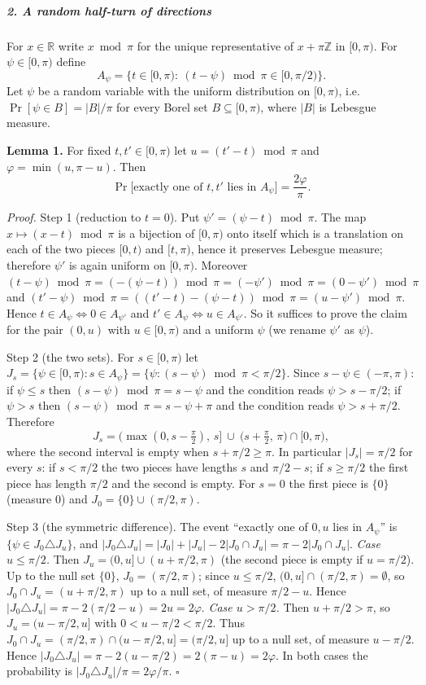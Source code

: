 \documentclass[11pt,a4paper]{article}
\begin{document}
\subparagraph{2. A random half-turn of
directions}\label{a-random-half-turn-of-directions}

For \(x\in\mathbb R\) write \(x\bmod\pi\) for the unique representative
of \(x+\pi\mathbb Z\) in \([0,\pi)\). For \(\psi\in[0,\pi)\) define
\[A_\psi=\{t\in[0,\pi):\ (t-\psi)\bmod\pi\in[0,\pi/2)\}.\] Let \(\psi\)
be a random variable with the uniform distribution on \([0,\pi)\),
i.e.~\(\Pr[\psi\in B]=|B|/\pi\) for every Borel set
\(B\subseteq[0,\pi)\), where \(|B|\) is Lebesgue measure.

\textbf{Lemma 1.} For fixed \(t,t'\in[0,\pi)\) let \(u=(t'-t)\bmod\pi\)
and \(\varphi=\min(u,\pi-u)\). Then
\[\Pr\big[\text{exactly one of } t,t' \text{ lies in } A_\psi\big]=\frac{2\varphi}{\pi}.\]

\emph{Proof.} Step 1 (reduction to \(t=0\)). Put
\(\psi'=(\psi-t)\bmod\pi\). The map \(x\mapsto(x-t)\bmod\pi\) is a
bijection of \([0,\pi)\) onto itself which is a translation on each of
the two pieces \([0,t)\) and \([t,\pi)\), hence it preserves Lebesgue
measure; therefore \(\psi'\) is again uniform on \([0,\pi)\). Moreover
\((t-\psi)\bmod\pi=(-(\psi-t))\bmod\pi=(-\psi')\bmod\pi=(0-\psi')\bmod\pi\)
and \((t'-\psi)\bmod\pi=((t'-t)-(\psi-t))\bmod\pi=(u-\psi')\bmod\pi\).
Hence \(t\in A_\psi\iff 0\in A_{\psi'}\) and
\(t'\in A_\psi\iff u\in A_{\psi'}\). So it suffices to prove the claim
for the pair \((0,u)\) with \(u\in[0,\pi)\) and a uniform \(\psi\) (we
rename \(\psi'\) as \(\psi\)).

Step 2 (the two sets). For \(s\in[0,\pi)\) let
\(J_s=\{\psi\in[0,\pi): s\in A_\psi\}=\{\psi: (s-\psi)\bmod\pi<\pi/2\}\).
Since \(s-\psi\in(-\pi,\pi)\): if \(\psi\le s\) then
\((s-\psi)\bmod\pi=s-\psi\) and the condition reads \(\psi>s-\pi/2\); if
\(\psi>s\) then \((s-\psi)\bmod\pi=s-\psi+\pi\) and the condition reads
\(\psi>s+\pi/2\). Therefore
\[J_s=\big(\max(0,s-\tfrac{\pi}{2}),\,s\big]\ \cup\ \big(s+\tfrac{\pi}{2},\,\pi\big)\cap[0,\pi),\]
where the second interval is empty when \(s+\pi/2\ge\pi\). In particular
\(|J_s|=\pi/2\) for every \(s\): if \(s<\pi/2\) the two pieces have
lengths \(s\) and \(\pi/2-s\); if \(s\ge\pi/2\) the first piece has
length \(\pi/2\) and the second is empty. For \(s=0\) the first piece is
\(\{0\}\) (measure \(0\)) and \(J_0=\{0\}\cup(\pi/2,\pi)\).

Step 3 (the symmetric difference). The event ``exactly one of \(0,u\)
lies in \(A_\psi\)'' is \(\{\psi\in J_0\triangle J_u\}\), and
\(|J_0\triangle J_u|=|J_0|+|J_u|-2|J_0\cap J_u|=\pi-2|J_0\cap J_u|\).
\emph{Case \(u\le\pi/2\).} Then \(J_u=(0,u]\cup(u+\pi/2,\pi)\) (the
second piece is empty if \(u=\pi/2\)). Up to the null set \(\{0\}\),
\(J_0=(\pi/2,\pi)\); since \(u\le\pi/2\),
\((0,u]\cap(\pi/2,\pi)=\emptyset\), so \(J_0\cap J_u=(u+\pi/2,\pi)\) up
to a null set, of measure \(\pi/2-u\). Hence
\(|J_0\triangle J_u|=\pi-2(\pi/2-u)=2u=2\varphi\). \emph{Case
\(u>\pi/2\).} Then \(u+\pi/2>\pi\), so \(J_u=(u-\pi/2,u]\) with
\(0<u-\pi/2<\pi/2\). Thus
\(J_0\cap J_u=(\pi/2,\pi)\cap(u-\pi/2,u]=(\pi/2,u]\) up to a null set,
of measure \(u-\pi/2\). Hence
\(|J_0\triangle J_u|=\pi-2(u-\pi/2)=2(\pi-u)=2\varphi\). In both cases
the probability is \(|J_0\triangle J_u|/\pi=2\varphi/\pi\). \(\square\)
\end{document}
